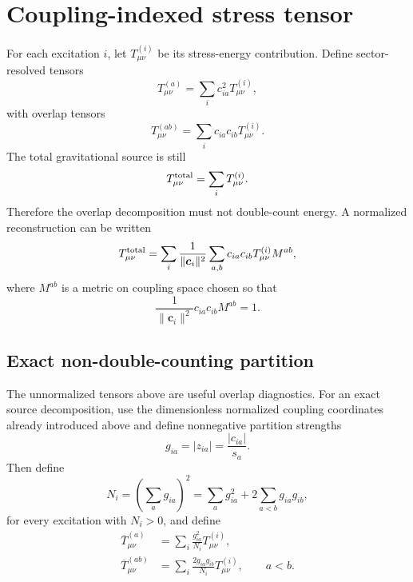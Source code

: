 \documentclass[11pt]{article}
\theoremstyle{remark}
\begin{document}
\section{Coupling-indexed stress tensor}
For each excitation $i$, let $T^{(i)}_{\mu\nu}$ be its stress-energy contribution. Define sector-resolved tensors
\begin{equation}
    T^{(a)}_{\mu\nu}=\sum_i c_{ia}^2 T^{(i)}_{\mu\nu},
\end{equation}
with overlap tensors
\begin{equation}
    T^{(ab)}_{\mu\nu}=\sum_i c_{ia}c_{ib}T^{(i)}_{\mu\nu}.
\end{equation}
The total gravitational source is still
\begin{equation}
    T^{\rm total}_{\mu\nu}=\sum_i T^{(i)}_{\mu\nu}.
\end{equation}
Therefore the overlap decomposition must not double-count energy. A normalized reconstruction can be written
\begin{equation}
    T^{\rm total}_{\mu\nu}
    =\sum_i \frac{1}{\lVert\bm c_i\rVert^2}
    \sum_{a,b} c_{ia}c_{ib}T^{(i)}_{\mu\nu}M^{ab},
\end{equation}
where $M^{ab}$ is a metric on coupling space chosen so that
\begin{equation}
    \frac{1}{\lVert\bm c_i\rVert^2}c_{ia}c_{ib}M^{ab}=1.
\end{equation}


\subsection{Exact non-double-counting partition}
The unnormalized tensors above are useful overlap diagnostics. For an exact source decomposition, use the dimensionless normalized coupling coordinates already introduced above and define nonnegative partition strengths
\begin{equation}
 g_{ia}=|z_{ia}|=\frac{|c_{ia}|}{s_a}.
\end{equation}
Then define
\begin{equation}
 N_i=\left(\sum_a g_{ia}\right)^2
 =\sum_a g_{ia}^2+2\sum_{a<b}g_{ia}g_{ib},
\end{equation}
for every excitation with $N_i>0$, and define
\begin{align}
 \overline T^{(a)}_{\mu\nu}
 &=\sum_i\frac{g_{ia}^2}{N_i}T^{(i)}_{\mu\nu},\\
 \overline T^{(ab)}_{\mu\nu}
 &=\sum_i\frac{2g_{ia}g_{ib}}{N_i}T^{(i)}_{\mu\nu},
 \qquad a<b.
 \label{eq:exact-overlap-partition}
\end{align}
\end{document}
